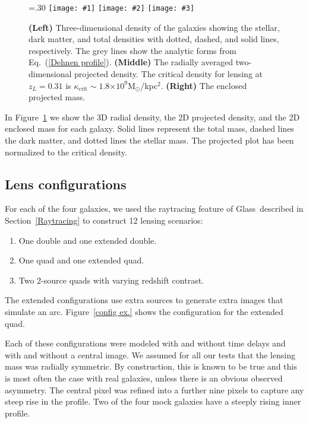 \documentclass[onecolumn,galley]{mn2e}
\newcommand{\Glass}{{\sc Glass}}
\newcommand{\Msun}{\ensuremath{\mathrm{M}_\odot}}
\newcommand{\figref}[1] {Figure~\ref{#1}}
\newcommand{\eqnref}[1] {Eq.~(\ref{#1})}
\newcommand{\secref}[1] {Section~\ref{#1}}
\newcommand{\e}[1]{\ensuremath{\times 10^{#1}}}
\newcommand\plotone[1]{%
 \centering
 \leavevmode
 \texttt{[image: \#1]}%
}%
\newcommand\plotthree[3]{{%
 \centering
 \leavevmode
 \columnwidth=.30\columnwidth
 \texttt{[image: \#1]}%
 \hfil
 \texttt{[image: \#2]}%
 \hfil
 \texttt{[image: \#3]}%
}}%
\begin{document}
\begin{figure}
\plotthree{MockGalProfile-a.pdf} {MockGalProfile-b.pdf} {MockGalProfile-c.pdf}
\caption{
\textbf{(Left)} 
Three-dimensional density of the galaxies showing the stellar, dark matter,
and total densities with dotted, dashed, and solid lines, respectively. The
grey lines show the analytic forms from \eqnref{Dehnen profile}. 
\textbf{(Middle)} 
The radially averaged two-dimensional projected density.
The critical density for lensing at $z_L=0.31$ is $\kappa_\mathrm{crit}\sim 1.8\e{9}$\Msun/kpc$^2$.
\textbf{(Right)}
The enclosed projected mass.
}
\label{mock galaxies}
\end{figure}

In \figref{mock galaxies} we show the 3D radial density, 
the 2D projected density, and the 2D enclosed mass for each
galaxy. Solid lines represent the total mass, dashed lines the dark 
matter, and dotted lines the stellar mass. The projected plot has
been normalized to the critical density.

\subsection{Lens configurations} %

For each of the four galaxies, we used the raytracing feature of \Glass\
described in \secref{Raytracing} to construct 12 lensing scenarios:

\begin{enumerate}
\item One double and one extended double.
\item One quad and one extended quad.
\item Two 2-source quads with varying redshift contrast.
\end{enumerate}

The extended configurations use extra sources to generate extra images that
simulate an arc. \figref{config ex.} shows the configuration for the extended
quad.

Each of these configurations were modeled with and without time delays and with
and without a central image. We assumed for all our tests that the lensing mass
was radially symmetric. By construction, this is known to be true and this is
most often the case with real galaxies, unless there is an obvious observed
asymmetry. The central pixel was refined into a further nine pixels to capture
any steep rise in the profile. Two of the four mock galaxies have a steeply rising
inner profile.
\end{document}
